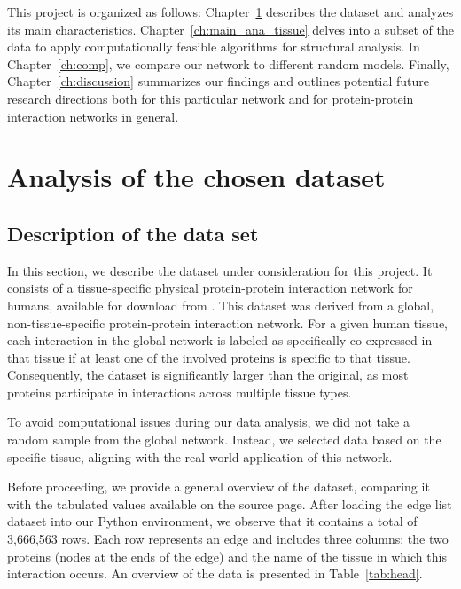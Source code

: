 \documentclass[paper=a4,fontsize=11pt,DIV=8,BCOR=5mm,oneside,pdftex,bibtotocnumbered]{scrreprt}
\theoremstyle{plain}
\begin{document}
	This project is organized as follows: Chapter~\ref{ch:analysis} describes the dataset and analyzes its main characteristics. Chapter~\ref{ch:main_ana_tissue} delves into a subset of the data to apply computationally feasible algorithms for structural analysis. In Chapter~\ref{ch:comp}, we compare our network to different random models. Finally, Chapter~\ref{ch:discussion} summarizes our findings and outlines potential future research directions both for this particular network and for protein-protein interaction networks in general.
	
	\chapter{Analysis of the chosen dataset}\label{ch:analysis}
	\section{Description of the data set}\label{sec:description_dataset}
	In this section, we describe the dataset under consideration for this project. It consists of a tissue-specific physical protein-protein interaction network for humans, available for download from \cite{biosnapnets}. This dataset was derived from a global, non-tissue-specific protein-protein interaction network. For a given human tissue, each interaction in the global network is labeled as specifically co-expressed in that tissue if at least one of the involved proteins is specific to that tissue. Consequently, the dataset is significantly larger than the original, as most proteins participate in interactions across multiple tissue types.
	
	To avoid computational issues during our data analysis, we did not take a random sample from the global network. Instead, we selected data based on the specific tissue, aligning with the real-world application of this network.
	
	Before proceeding, we provide a general overview of the dataset, comparing it with the tabulated values available on the source page. After loading the edge list dataset into our Python environment, we observe that it contains a total of 3,666,563 rows. Each row represents an edge and includes three columns: the two proteins (nodes at the ends of the edge) and the name of the tissue in which this interaction occurs. An overview of the data is presented in Table~\ref{tab:head}.
	
\end{document}
